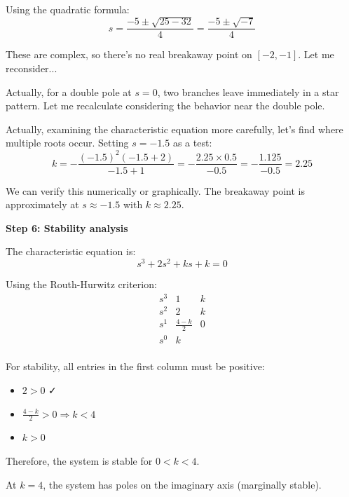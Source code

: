 \documentclass[11pt,a4paper]{article}
\begin{document}
Using the quadratic formula:
\begin{equation}
  s = \frac{-5 \pm \sqrt{25 - 32}}{4} = \frac{-5 \pm \sqrt{-7}}{4}
\end{equation}

These are complex, so there's no real breakaway point on $[-2, -1]$. Let me reconsider...

Actually, for a double pole at $s=0$, two branches leave immediately in a star pattern. Let me recalculate considering the behavior near the double pole.

Actually, examining the characteristic equation more carefully, let's find where multiple roots occur. Setting $s = -1.5$ as a test:
\begin{equation}
  k = -\frac{(-1.5)^2(-1.5 + 2)}{-1.5 + 1} = -\frac{2.25 \times 0.5}{-0.5} = -\frac{1.125}{-0.5} = 2.25
\end{equation}

We can verify this numerically or graphically. The breakaway point is approximately at $s \approx -1.5$ with $k \approx 2.25$.

\textbf{Step 6: Stability analysis}

The characteristic equation is:
\begin{equation}
  s^3 + 2s^2 + ks + k = 0
\end{equation}

Using the Routh-Hurwitz criterion:
\begin{equation}
  \begin{array}{c|cc}
    s^3 & 1 & k \\
    s^2 & 2 & k \\
    s^1 & \frac{4 - k}{2} & 0 \\
    s^0 & k & \\
  \end{array}
\end{equation}

For stability, all entries in the first column must be positive:
\begin{itemize}
  \item $2 > 0$ ✓
  \item $\frac{4 - k}{2} > 0 \Rightarrow k < 4$
  \item $k > 0$
\end{itemize}

Therefore, the system is stable for $0 < k < 4$.

At $k = 4$, the system has poles on the imaginary axis (marginally stable).
\end{document}

